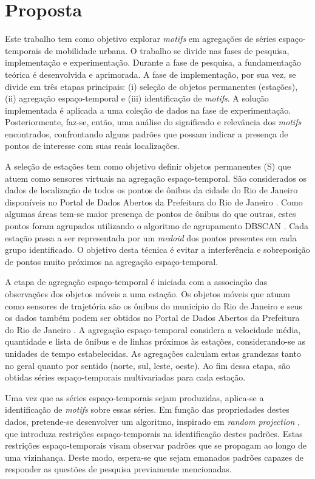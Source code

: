 \documentclass[12pt]{report} %
\begin{document}
\chapter{Proposta} 
\label{sec:proposta}
Este trabalho tem como objetivo explorar \emph{motifs} em agregações de séries espaço-temporais de mobilidade urbana.
O trabalho se divide nas fases de pesquisa, implementação e experimentação. Durante a fase de pesquisa, a fundamentação teórica é desenvolvida e aprimorada. A fase de implementação, por sua vez, se divide em três etapas principais: (i) seleção de objetos permanentes (estações), (ii) agregação espaço-temporal e (iii) identificação de \emph{motifs}. A solução implementada é aplicada a uma coleção de dados na fase de experimentação. Posteriormente, faz-se, então, uma análise do significado e relevância dos \emph{motifs} encontrados, confrontando alguns padrões que possam indicar a presença de pontos de interesse com suas reais localizações. 

A seleção de estações tem como objetivo definir objetos permanentes (S) que atuem como sensores virtuais na agregação espaço-temporal. São considerados os dados de localização de todos os pontos de ônibus da cidade do Rio de Janeiro disponíveis no Portal de Dados Abertos da Prefeitura do Rio de Janeiro \citep{datario}. Como algumas áreas tem-se maior presença de pontos de ônibus do que outras, estes pontos foram agrupados utilizando o algoritmo de agrupamento DBSCAN \citep{borah2004improved}. Cada estação passa a ser representada por um \emph{medoid} dos pontos presentes em cada grupo identificado. O objetivo desta técnica é evitar a interferência e sobreposição de pontos muito próximos na agregação espaço-temporal. 

A etapa de agregação espaço-temporal é iniciada com a associação das observações dos objetos móveis a uma estação. Os objetos móveis que atuam como sensores de trajetória são os ônibus do município do Rio de Janeiro e seus os dados também podem ser obtidos no Portal de Dados Abertos da Prefeitura do Rio de Janeiro \citep{datario}. A agregação espaço-temporal considera a velocidade média, quantidade e lista de ônibus e de linhas próximos às estações, considerando-se as unidades de tempo estabelecidas. As agregações calculam estas grandezas tanto no geral quanto por sentido (norte, sul, leste, oeste). Ao fim dessa etapa, são obtidas séries espaço-temporais multivariadas para cada estação. 

Uma vez que as séries espaço-temporais sejam produzidas, aplica-se a identificação de \emph{motifs} sobre essas séries. Em função das propriedades destes dados, pretende-se desenvolver um algoritmo, inspirado em \emph{random projection} \citep{li2009probabilistic}, que introduza restrições espaço-temporais na identificação destes padrões. Estas restrições espaço-temporais visam observar padrões que se propagam ao longo de uma vizinhança. Deste modo, espera-se que sejam emanados padrões capazes de responder as questões de pesquisa previamente mencionadas.  
\end{document}
